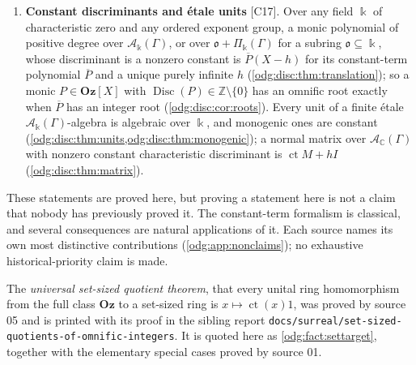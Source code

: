 \documentclass[11pt,oneside]{article}
\numberwithin{equation}{section}
\theoremstyle{definition}
\theoremstyle{remark}
\newcommand{\Oz}{\mathbf{Oz}}
\newcommand{\Z}{\mathbb Z}
\newcommand{\C}{\mathbb C}
\newcommand{\ct}{\operatorname{ct}}
\newcommand{\src}[1]{\textup{\textsf{\small[#1]}}}
\newcommand{\fn}[1]{\nolinkurl{#1}}
\newcommand{\crA}{\mathcal A_\Bbbk(\Gamma)}
\newcommand{\crP}{\Pi_\Bbbk(\Gamma)}
\newcommand{\Aff}{\mathbb A}
\newcommand{\Disc}{\operatorname{Disc}}
\begin{document}
\begin{enumerate}[label=\textup{(\arabic*)},leftmargin=*,itemsep=3pt]
the integral model with $\Aff^1_\Z$. Semiabelian varieties are rigid. For a
smooth connected commutative algebraic group the constant-term kernel is
isomorphic, as a group, to $\crP^{\,d}$ after choosing vector coordinates;
this is not an algebraic splitting of the group. On rigid projective
targets only rational points have invertible coordinate ideals
(\cref{odg:cr:thm:semiabelian,odg:cr:thm:groupkernel,odg:cr:thm:ozideal}). Global
logarithmic symmetric differentials on a smooth proper compactification with
normal-crossings boundary vanish on the Euler derivations at every point, so the
complement is rigid when they separate tangent directions
(\cref{odg:log:thm:annihilation,odg:log:cor:criterion}) \src{C15}. A geometrically
integral affine curve, singular or not, has nonconstant $\crA$-points, for
$\Gamma\ne0$, exactly when its normalization is $\Aff^1$; a conductor of the curve and Seidenberg's identity give finite
derivative-order certificates, and the rigid singular curves have only ordinary omnific
points (\cref{odg:sg:thm:main,odg:sg:thm:conductor,odg:sg:thm:omnific}) \src{C16}.
\item \textbf{Constant discriminants and \'etale units} \src{C17}. Over any field $\Bbbk$
of characteristic zero and any ordered exponent group, a monic polynomial of
positive degree over $\crA$, or
over $\mathfrak o+\crP$ for a subring $\mathfrak o\subseteq\Bbbk$, whose discriminant is a
nonzero constant is $\overline P(X-h)$ for its constant-term polynomial $\overline P$ and
a unique purely infinite $h$ (\cref{odg:disc:thm:translation}); so a monic
$P\in\Oz[X]$ with $\Disc(P)\in\Z\setminus\{0\}$ has an omnific root exactly when
$\overline P$ has an integer root (\cref{odg:disc:cor:roots}). Every unit of a finite
\'etale $\crA$-algebra is algebraic over $\Bbbk$, and monogenic ones are constant
(\cref{odg:disc:thm:units,odg:disc:thm:monogenic}); a normal matrix over
$\mathcal A_\C(\Gamma)$ with nonzero constant characteristic discriminant is
$\ct M+hI$ (\cref{odg:disc:thm:matrix}).
\end{enumerate}

These statements are proved here, but proving a statement here is not a
claim that nobody has previously proved it. The constant-term formalism is
classical, and several consequences are natural applications of it. Each
source names its own most distinctive contributions (\cref{odg:app:nonclaims});
no exhaustive historical-priority claim is made.

The \emph{universal set-sized quotient theorem}, that every unital ring
homomorphism from the full class $\Oz$ to a set-sized ring is
$x\mapsto\ct(x)1$, was proved by source 05 and is printed with its proof in
the sibling report \fn{docs/surreal/set-sized-quotients-of-omnific-integers}.
It is quoted here as \cref{odg:fact:settarget}, together with the elementary
special cases proved by source 01.
\end{document}
